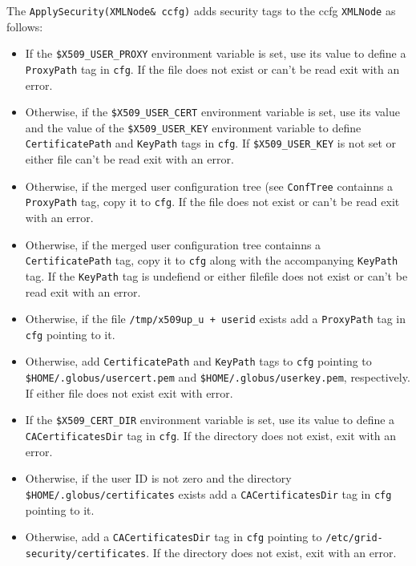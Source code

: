 \documentclass{book}
\newcommand{\XMLNode}{\texttt{XMLNode}}
\begin{document}
The \texttt{ApplySecurity(XMLNode\& ccfg)} adds security tags to the
ccfg {\XMLNode} as follows:

\begin{itemize}
\item{If the \texttt{\$X509\_USER\_PROXY} environment variable is set,
  use its value to define a \texttt{ProxyPath} tag in \texttt{cfg}. If
  the file does not exist or can't be read exit with an error.}
\item{Otherwise, if the \texttt{\$X509\_USER\_CERT} environment
  variable is set, use its value and the value of the
  \texttt{\$X509\_USER\_KEY} environment variable to define
  \texttt{CertificatePath} and \texttt{KeyPath} tags in \texttt{cfg}.
  If \texttt{\$X509\_USER\_KEY} is not set or either file can't be
  read exit with an error.}
\item{Otherwise, if the merged user configuration tree (see
  \texttt{ConfTree} containns a \texttt{ProxyPath} tag, copy it to
  \texttt{cfg}.  If the file does not exist or can't be read exit with
  an error.}
\item{Otherwise, if the merged user configuration tree containns a
  \texttt{CertificatePath} tag, copy it to \texttt{cfg} along with the
  accompanying \texttt{KeyPath} tag. If the \texttt{KeyPath} tag is
  undefiend or either filefile does not exist or can't be read exit
  with an error.}
\item{Otherwise, if the file \texttt{/tmp/x509up\_u + userid} exists
  add a \texttt{ProxyPath} tag in \texttt{cfg} pointing to it.}
\item{Otherwise, add \texttt{CertificatePath} and \texttt{KeyPath}
  tags to \texttt{cfg} pointing to
  \texttt{\$HOME/.globus/usercert.pem} and
  \texttt{\$HOME/.globus/userkey.pem}, respectively. If either file
  does not exist exit with error.}
\item{If the \texttt{\$X509\_CERT\_DIR} environment variable is set,
  use its value to define a \texttt{CACertificatesDir} tag in
  \texttt{cfg}. If the directory does not exist, exit with an error.}
\item{Otherwise, if the user ID is not zero and the directory
  \texttt{\$HOME/.globus/certificates} exists add a
  \texttt{CACertificatesDir} tag in \texttt{cfg} pointing to it.}
\item{Otherwise, add a \texttt{CACertificatesDir} tag in \texttt{cfg}
  pointing to \texttt{/etc/grid-security/certificates}. If the
  directory does not exist, exit with an error.}
\end{itemize}
\end{document}
